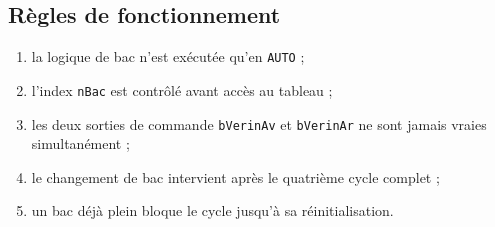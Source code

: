 {  \subsection{Règles de fonctionnement}
  \begin{enumerate}\small
    \item la logique de bac n'est exécutée qu'en \texttt{AUTO} ;
    \item l'index \texttt{nBac} est contrôlé avant accès au tableau ;
    \item les deux sorties de commande \texttt{bVerinAv} et \texttt{bVerinAr} ne sont jamais vraies simultanément ;
    \item le changement de bac intervient après le quatrième cycle complet ;
    \item un bac déjà plein bloque le cycle jusqu'à sa réinitialisation.
  \end{enumerate}
}

\newpage

